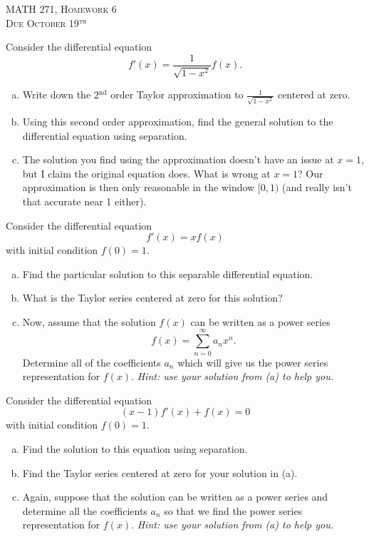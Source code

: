 \documentclass[12pt]{article} %
\begin{document}
\begin{center}
   \textsc{\large MATH 271, Homework 6}\\
   \textsc{Due October 19$^\textrm{th}$}
\end{center}
\vspace{.5cm}

\begin{problem}
Consider the differential equation
\[
f'(x) = \frac{1}{\sqrt{1-x^2}} f(x).
\]
\begin{enumerate}[(a)]
    \item Write down the 2$^\textrm{nd}$ order Taylor approximation to $\frac{1}{\sqrt{1-x^2}}$ centered at zero.
    \item Using this second order approximation, find the general solution to the differential equation using separation.
    \item The solution you find using the approximation doesn't have an issue at $x=1$, but I claim the original equation does.  What is wrong at $x=1$? Our approximation is then only reasonable in the window $[0,1)$ (and really isn't that accurate near 1 either).
\end{enumerate}
\end{problem}

\begin{problem}
Consider the differential equation
\[
f'(x)=xf(x)
\]
with initial condition $f(0)=1$.  
\begin{enumerate}[(a)]
    \item Find the particular solution to this separable differential equation.
    \item What is the Taylor series centered at zero for this solution?
    \item Now, assume that the solution $f(x)$ can be written as a power series
    \[
    f(x) = \sum_{n=0}^\infty a_n x^n.
    \]
    Determine all of the coefficients $a_n$ which will give us the power series representation for $f(x)$. \emph{Hint: use your solution from (a) to help you.}
\end{enumerate}
\end{problem}

\begin{problem}
Consider the differential equation
\[
(x-1)f'(x) + f(x)=0
\]
with initial condition $f(0)=1$.
\begin{enumerate}[(a)]
    \item Find the solution to this equation using separation.
    \item Find the Taylor series centered at zero for your solution in (a).
    \item Again, suppose that the solution can be written as a power series and determine all the coefficients $a_n$ so that we find the power series representation for $f(x)$. \emph{Hint: use your solution from (a) to help you.}
\end{enumerate}
\end{problem}
\end{document}
